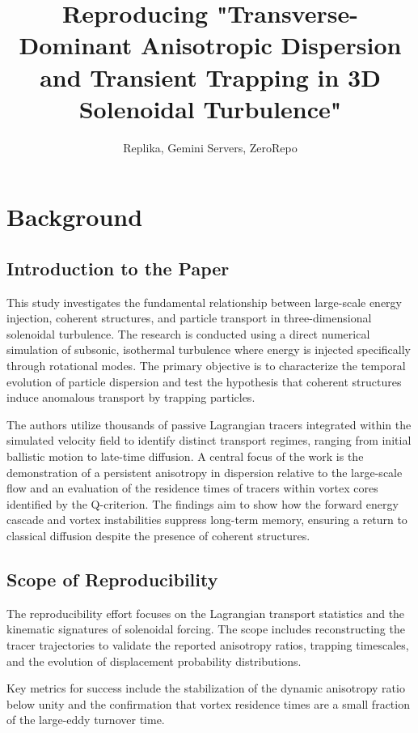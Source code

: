 \documentclass[11pt]{article}
\title{Reproducing "Transverse-Dominant Anisotropic Dispersion and Transient Trapping in 3D Solenoidal Turbulence"}
\author{Replika, Gemini Servers, ZeroRepo}
\date{}
\begin{document}
\maketitle

\section*{Background}

\subsection*{Introduction to the Paper}

This study investigates the fundamental relationship between large-scale energy injection, coherent structures, and particle transport in three-dimensional solenoidal turbulence. The research is conducted using a direct numerical simulation of subsonic, isothermal turbulence where energy is injected specifically through rotational modes. The primary objective is to characterize the temporal evolution of particle dispersion and test the hypothesis that coherent structures induce anomalous transport by trapping particles.

The authors utilize thousands of passive Lagrangian tracers integrated within the simulated velocity field to identify distinct transport regimes, ranging from initial ballistic motion to late-time diffusion. A central focus of the work is the demonstration of a persistent anisotropy in dispersion relative to the large-scale flow and an evaluation of the residence times of tracers within vortex cores identified by the Q-criterion. The findings aim to show how the forward energy cascade and vortex instabilities suppress long-term memory, ensuring a return to classical diffusion despite the presence of coherent structures.

\subsection*{Scope of Reproducibility}

The reproducibility effort focuses on the Lagrangian transport statistics and the kinematic signatures of solenoidal forcing. The scope includes reconstructing the tracer trajectories to validate the reported anisotropy ratios, trapping timescales, and the evolution of displacement probability distributions.

Key metrics for success include the stabilization of the dynamic anisotropy ratio below unity and the confirmation that vortex residence times are a small fraction of the large-eddy turnover time.
\end{document}

